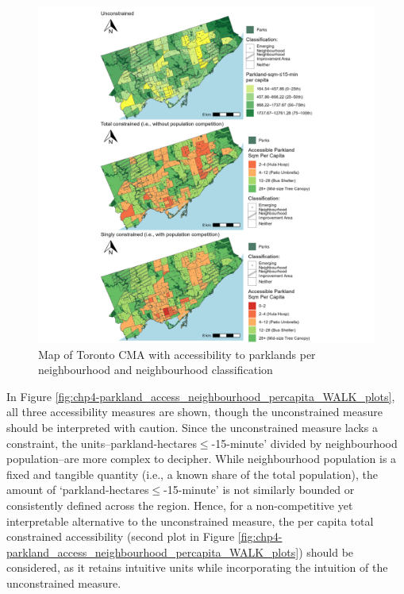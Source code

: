 \documentclass[
11pt, %
oneside, %
english, %
singlespacing, %
]{macthesis} %
\begin{document}
\begin{figure}

{\centering \includegraphics[width=6in]{./data/figures/chp4-parkland_access_neighbourhood_percapita_WALK_plots} 

}

\caption{\label{fig:chp4-parkland_access_neighbourhood_percapita_WALK_plots}Map of Toronto CMA with accessibility to parklands per neighbourhood and neighbourhood classification}\label{fig:unnamed-chunk-60}
\end{figure}

In Figure \ref{fig:chp4-parkland_access_neighbourhood_percapita_WALK_plots}, all three accessibility measures are shown, though the unconstrained measure should be interpreted with caution. Since the unconstrained measure lacks a constraint, the units--parkland-hectares\(\le\)-15-minute' divided by neighbourhood population--are more complex to decipher. While neighbourhood population is a fixed and tangible quantity (i.e., a known share of the total population), the amount of `parkland-hectares\(\le\)-15-minute' is not similarly bounded or consistently defined across the region. Hence, for a non-competitive yet interpretable alternative to the unconstrained measure, the per capita total constrained accessibility (second plot in Figure \ref{fig:chp4-parkland_access_neighbourhood_percapita_WALK_plots}) should be considered, as it retains intuitive units while incorporating the intuition of the unconstrained measure.
\end{document}
